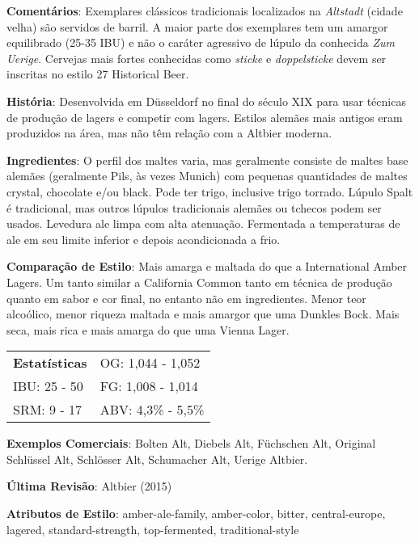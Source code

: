 \textbf{Comentários}: Exemplares clássicos tradicionais localizados na \textit{Altstadt} (cidade velha) são servidos de barril. A maior parte dos exemplares tem um amargor equilibrado (25-35 IBU) e não o caráter agressivo de lúpulo da conhecida \textit{Zum Uerige}. Cervejas mais fortes conhecidas como \textit{sticke} e \textit{doppelsticke} devem ser inscritas no estilo 27 Historical Beer.

\textbf{História}: Desenvolvida em Düsseldorf no final do século XIX para usar técnicas de produção de lagers e competir com lagers. Estilos alemães mais antigos eram produzidos na área, mas não têm relação com a Altbier moderna.

\textbf{Ingredientes}: O perfil dos maltes varia, mas geralmente consiste de maltes base alemães (geralmente Pils, às vezes Munich) com pequenas quantidades de maltes crystal, chocolate e/ou black. Pode ter trigo, inclusive trigo torrado. Lúpulo Spalt é tradicional, mas outros lúpulos tradicionais alemães ou tchecos podem ser usados. Levedura ale limpa com alta atenuação. Fermentada a temperaturas de ale em seu limite inferior e depois acondicionada a frio.

\textbf{Comparação de Estilo}: Mais amarga e maltada do que a International Amber Lagers. Um tanto similar a California Common tanto em técnica de produção quanto em sabor e cor final, no entanto não em ingredientes. Menor teor alcoólico, menor riqueza maltada e mais amargor que uma Dunkles Bock. Mais seca, mais rica e mais amarga do que uma Vienna Lager.

\begin{tabular}{@{}p{35mm}p{35mm}@{}}
  \textbf{Estatísticas} & OG: 1,044 - 1,052 \\
  IBU: 25 - 50 & FG: 1,008 - 1,014 \\
  SRM: 9 - 17 & ABV: 4,3\% - 5,5\%
\end{tabular}

\textbf{Exemplos Comerciais}: Bolten Alt, Diebels Alt, Füchschen Alt, Original Schlüssel Alt, Schlösser Alt, Schumacher Alt, Uerige Altbier.

\textbf{Última Revisão}: Altbier (2015)

\textbf{Atributos de Estilo}: amber-ale-family, amber-color, bitter, central-europe, lagered, standard-strength, top-fermented, traditional-style
